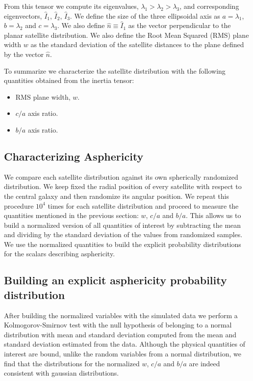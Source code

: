 \documentclass[a4paper,fleqn,usenatbib]{mnras}
\begin{document}
From this tensor we compute its eigenvalues,
$\lambda_1>\lambda_2>\lambda_3$, and corresponding eigenvectors,
$\hat{I}_1$, $\hat{I}_2$, $\hat{I}_3$.
We define the size of the three ellipsoidal axis as
$a=\lambda_1$, $b=\lambda_2$ and $c=\lambda_3$.
We also define $\hat{n}\equiv \hat{I}_1$ as the vector perpendicular to the
planar satellite distribution. 
We also define the Root Mean Squared (RMS) plane width $w$ as the
standard deviation of the satellite distances to the plane defined by
the vector $\hat{n}$.    

To summarize we characterize the satellite distribution with the following
quantities obtained from the inertia tensor: 
\begin{itemize}
\item RMS plane width, $w$.
\item $c/a$ axis ratio.
\item $b/a$ axis ratio.
\end{itemize}



\subsection{Characterizing Asphericity}

We compare each satellite distribution against its own spherically
randomized distribution.
We keep fixed the radial position of every satellite
with respect to the central galaxy and then randomize its angular
position. 
We repeat this procedure $10^4$ times for each satellite distribution
and proceed to measure the quantities mentioned in the previous section:
$w$, $c/a$ and $b/a$.
This allows us to build a normalized version of all quantities of
interest by subtracting the mean and dividing by the standard
deviation of the values from randomized samples.
We use the normalized quantities to build the explicit probability
distributions for the scalars describing asphericity. 


\subsection{Building an explicit asphericity probability distribution}

After building the normalized variables with the simulated data we
perform a Kolmogorov-Smirnov test with the null hypothesis of belonging
to a normal distribution with mean and standard deviation computed
from the mean and standard deviation estimated from the data.
Although the physical quantities of interest are bound, unlike the
random variables from a normal distribution, we find that the
distributions for the normalized $w$, $c/a$ and $b/a$ are indeed
consistent with gaussian distributions. 
\end{document}
